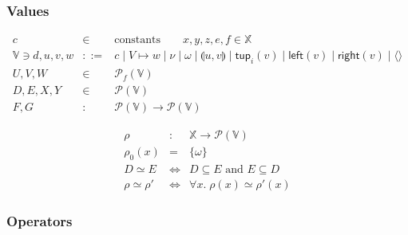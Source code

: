 \documentclass[10pt]{article}
\theoremstyle{acmplain}
\newcommand{\key}[1]{\mathsf{#1}}
\newcommand{\SET}[1]{\mathcal{P}(#1)}
\newcommand{\FSET}[1]{\mathcal{P}_f(#1)}
\newcommand{\V}{\mathbb{V}}
\newcommand{\X}{\mathbb{X}}
\newcommand{\pairv}[2]{\llparenthesis #1, #2 \rrparenthesis}
\newcommand{\tup}[2]{\key{tup}_{#1}(#2)}
\newcommand{\Left}[1]{\key{left}(#1)}
\newcommand{\Right}[1]{\key{right}(#1)}
\newcommand{\emptytup}{\langle\rangle}
\begin{document}
\subsubsection{Values}

\[
\begin{array}{rcl}
  c &\in& \text{constants} \qquad x, y, z, e, f \in \X \\[1ex]
  \V \ni d, u, v, w &::=& c \mid V \mapsto w \mid \nu \mid \omega
     \mid \pairv{u}{v}
     \mid \tup{i}{v} \mid \Left{v} \mid \Right{v} \mid \emptytup \\
  U, V, W &\in& \FSET{\V} \\
  D, E, X, Y &\in& \SET{\V} \\
  F, G &:& \SET{\V} \to \SET{\V}
\end{array}
\]

\[
\begin{array}{rcl}
  \rho &:& \X \to \SET{\V} \\
  \rho_0(x) &=& \{\omega\} \\
  D \simeq E &\iff& D \subseteq E \text{ and } E \subseteq D \\
  \rho \simeq \rho' &\iff& \forall x.\; \rho(x) \simeq \rho'(x)
\end{array}
\]

\subsubsection{Operators}\label{sec:den-ops}
\end{document}
